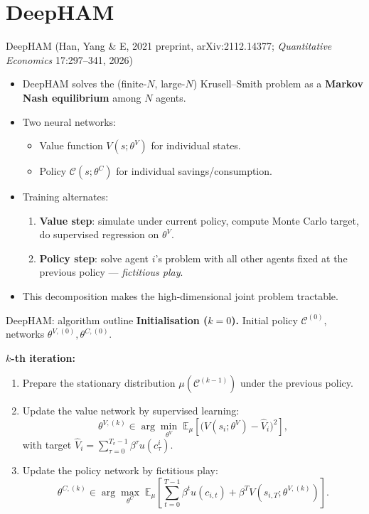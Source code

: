 \section{DeepHAM}

\begin{frame}{DeepHAM (Han, Yang \& E, 2021 preprint, arXiv:2112.14377; \emph{Quantitative Economics} 17:297--341, 2026)}
\begin{itemize}
\item DeepHAM solves the (finite-$N$, large-$N$) Krusell--Smith problem as a \textbf{Markov Nash equilibrium} among $N$ agents.
\medskip
\item Two neural networks:
  \begin{itemize}
  \item Value function $V(s;\theta^V)$ for individual states.
  \item Policy $\mathcal{C}(s;\theta^C)$ for individual savings/consumption.
  \end{itemize}
\medskip
\item Training alternates:
  \begin{enumerate}
  \item \textbf{Value step}: simulate under current policy, compute Monte Carlo target, do supervised regression on $\theta^V$.
  \item \textbf{Policy step}: solve agent $i$'s problem with all other agents fixed at the previous policy --- \emph{fictitious play}.
  \end{enumerate}
\medskip
\item This decomposition makes the high-dimensional joint problem tractable.
\end{itemize}
\end{frame}

\begin{frame}{DeepHAM: algorithm outline}
\textbf{Initialisation ($k=0$).} Initial policy $\mathcal{C}^{(0)}$, networks $\theta^{V,(0)}, \theta^{C,(0)}$.
\medskip

\textbf{$k$-th iteration:}
\begin{enumerate}
\item Prepare the stationary distribution $\mu(\mathcal{C}^{(k-1)})$ under the previous policy.
\medskip
\item Update the value network by supervised learning:
\[
\theta^{V,(k)} \in \arg\min_{\theta^V}\;
\mathbb{E}_\mu\!\left[\big(V(s_i;\theta^V) - \hat V_i\big)^2\right],
\]
with target $\hat V_i = \sum_{\tau=0}^{T_v-1}\beta^\tau u(c_\tau^i)$.
\medskip
\item Update the policy network by fictitious play:
\[
\theta^{C,(k)} \in \arg\max_{\theta^C}\;
\mathbb{E}_\mu\!\left[\sum_{t=0}^{T-1}\beta^t u(c_{i,t}) + \beta^T V(s_{i,T};\theta^{V,(k)})\right].
\]
\end{enumerate}
\end{frame}

